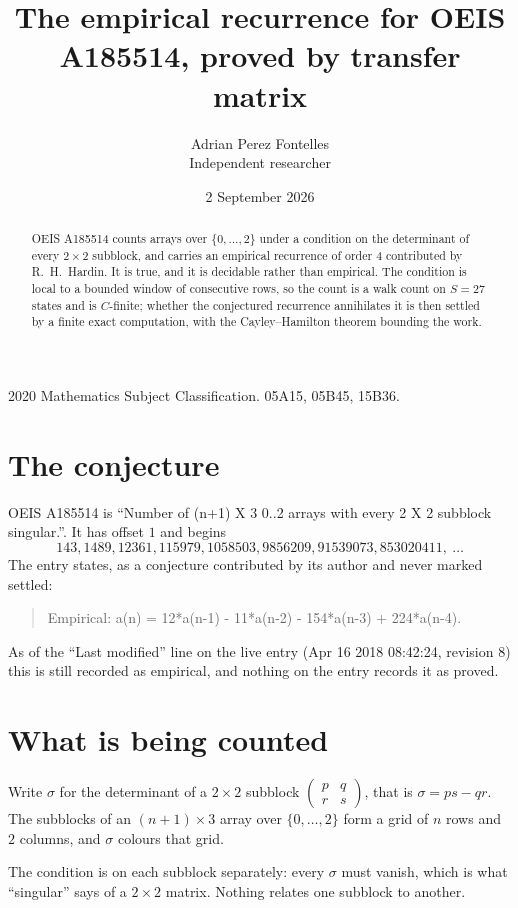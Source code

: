 \documentclass[11pt,a4paper]{article}
\title{The empirical recurrence for OEIS A185514, proved by transfer matrix}
\author{Adrian Perez Fontelles\\ \small Independent researcher}
\date{2 September 2026}
\theoremstyle{plain}
\theoremstyle{definition}
\begin{document}
\maketitle

\begin{abstract}
OEIS A185514 counts arrays over $\{0,\dots,2\}$ under a condition on the determinant of every
$2\times2$ subblock, and carries an empirical recurrence of order $4$ contributed by
R.~H.~Hardin. It is true, and it is decidable rather than empirical. The condition is local to
a bounded window of consecutive rows, so the count is a walk count on $S=27$ states and is
$C$-finite; whether the conjectured recurrence annihilates it is then settled by a finite exact
computation, with the Cayley--Hamilton theorem bounding the work.
\end{abstract}

\noindent\small 2020 Mathematics Subject Classification. 05A15, 05B45, 15B36.\normalsize

\section{The conjecture}

OEIS A185514 is ``Number of (n+1) X 3 0..2 arrays with every 2 X 2 subblock singular.''. It has offset $1$ and begins
\[
143, 1489, 12361, 115979, 1058503, 9856209, 91539073, 853020411,\ \dots
\]
The entry states, as a conjecture contributed by its author and never marked settled:
\begin{quote}
Empirical: a(n) = 12*a(n-1) - 11*a(n-2) - 154*a(n-3) + 224*a(n-4).
\end{quote}
As of the ``Last modified'' line on the live entry (Apr 16 2018 08:42:24, revision 8) this is still
recorded as empirical, and nothing on the entry records it as proved.

\section{What is being counted}

Write $\sigma$ for the determinant of a $2\times2$ subblock
$\begin{pmatrix}p&q\\r&s\end{pmatrix}$, that is $\sigma=ps-qr$. The subblocks of an
$(n+1)\times3$ array over $\{0,\dots,2\}$ form a grid of $n$ rows and $2$
columns, and $\sigma$ colours that grid.

The condition is on each subblock separately: every $\sigma$ must vanish, which is what
``singular'' says of a $2\times2$ matrix. Nothing
relates one subblock to another.
\end{document}
